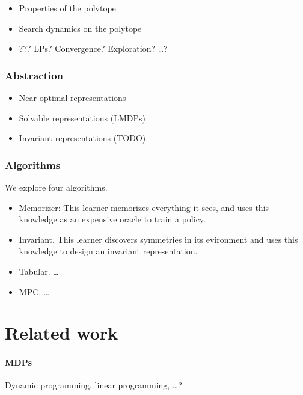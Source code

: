 \begin{itemize}
\tightlist
\item
  Properties of the polytope
\item
  Search dynamics on the polytope
\item
  ??? LPs? Convergence? Exploration? \ldots{}?
\end{itemize}

\hypertarget{abstraction}{%
\subsubsection{Abstraction}\label{abstraction}}

\begin{itemize}
\tightlist
\item
  Near optimal representations
\item
  Solvable representations (LMDPs)
\item
  Invariant representations (TODO)
\end{itemize}

\hypertarget{algorithms}{%
\subsubsection{Algorithms}\label{algorithms}}

We explore four algorithms.

\begin{itemize}
\tightlist
\item
  Memorizer: This learner memorizes everything it sees, and uses this
  knowledge as an expensive oracle to train a policy.
\item
  Invariant. This learner discovers symmetries in its evironment and
  uses this knowledge to design an invariant representation.
\item
  Tabular. \ldots{}
\item
  MPC. \ldots{}
\end{itemize}


\hypertarget{related-work}{%
\section{Related work}\label{related-work}}

\hypertarget{mdps}{%
\paragraph{MDPs}\label{mdps}}

Dynamic programming, linear programming, \ldots{}?

